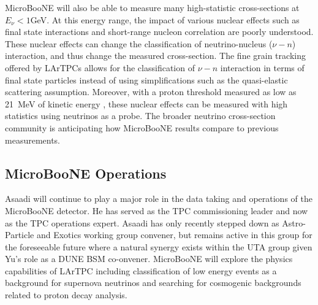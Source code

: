 MicroBooNE will also be able to measure many high-statistic cross-sections at $E_{\nu} < 1$GeV. At this energy range, the impact of various nuclear effects such as final state interactions and short-range nucleon correlation are poorly understood. These nuclear effects can change the classification of neutrino-nucleus ($\nu-n$) interaction, and thus change the measured cross-section. The fine grain tracking offered by LArTPCs allows for the classification of $\nu-n$ interaction in terms of final state particles instead of using simplifications such as the quasi-elastic scattering assumption. Moreover, with a proton threshold measured as low as 21~MeV of kinetic energy \cite{Argoneut}, these nuclear effects can be measured with high statistics using neutrinos as a probe. The broader neutrino cross-section community is anticipating how MicroBooNE results compare to previous measurements.


\subsection{MicroBooNE Operations}\label{sec:UbooneOperations}
Asaadi will continue to play a major role in the data taking and operations of the MicroBooNE detector.  He has served as the TPC commissioning leader and now as the TPC operations expert. Asaadi has only recently stepped down as Astro-Particle and Exotics working group convener, but remains active in this group for the foreseeable future where a natural synergy exists within the UTA group given Yu's role as a DUNE BSM co-onvener. MicroBooNE will explore the physics capabilities of LArTPC including classification of low energy events as a background for supernova neutrinos and searching for cosmogenic backgrounds related to proton decay analysis.

